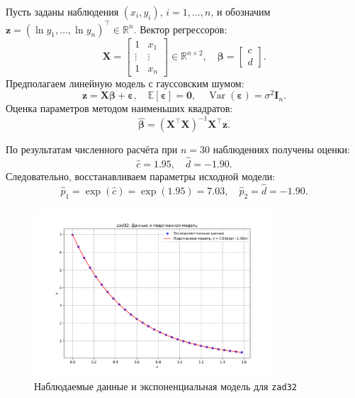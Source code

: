 Пусть заданы наблюдения $(x_i, y_i)$, $i = 1, \dots, n$, и обозначим $\mathbf{z} = (\ln y_1, \dots, \ln y_n)^\top \in \mathbb{R}^n$. Вектор регрессоров:
\[
\mathbf{X} = 
\begin{bmatrix}
1 & x_1 \\
\vdots & \vdots \\
1 & x_n
\end{bmatrix} \in \mathbb{R}^{n \times 2}, 
\quad 
\boldsymbol{\beta} = 
\begin{bmatrix}
c \\ d
\end{bmatrix}.
\]
Предполагаем линейную модель с гауссовским шумом:
\begin{equation}
    \mathbf{z} = \mathbf{X} \boldsymbol{\beta} + \boldsymbol{\varepsilon}, \quad \mathbb{E}[\boldsymbol{\varepsilon}] = \mathbf{0}, \quad \operatorname{Var}(\boldsymbol{\varepsilon}) = \sigma^2 \mathbf{I}_n.
\end{equation}
Оценка параметров методом наименьших квадратов:
\begin{equation}
    \hat{\boldsymbol{\beta}} = (\mathbf{X}^\top \mathbf{X})^{-1} \mathbf{X}^\top \mathbf{z}.
\end{equation}

По результатам численного расчёта при $n = 30$ наблюдениях получены оценки:
\[
\hat{c} = 1.95, \quad \hat{d} = -1.90.
\]
Следовательно, восстанавливаем параметры исходной модели:
\[
\hat{p}_1 = \exp(\hat{c}) = \exp(1.95) = 7.03, \quad \hat{p}_2 = \hat{d} = -1.90.
\]

\begin{figure}[H]
\centering
\includegraphics[width=0.8\textwidth]{fig/zad32_data_fit.png}
\caption{Наблюдаемые данные и экспоненциальная модель для \texttt{zad32}}
\label{fig:zad32_data_fit}
\end{figure}



